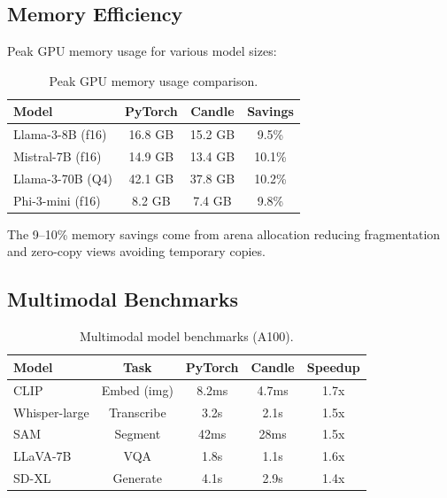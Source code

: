 \subsection{Memory Efficiency}

Peak GPU memory usage for various model sizes:

\begin{table}[H]
\centering
\small
\begin{tabular}{lccc}
\toprule
\textbf{Model} & \textbf{PyTorch} & \textbf{Candle} & \textbf{Savings} \\
\midrule
Llama-3-8B (f16) & 16.8 GB & 15.2 GB & 9.5\% \\
Mistral-7B (f16) & 14.9 GB & 13.4 GB & 10.1\% \\
Llama-3-70B (Q4) & 42.1 GB & 37.8 GB & 10.2\% \\
Phi-3-mini (f16) & 8.2 GB & 7.4 GB & 9.8\% \\
\bottomrule
\end{tabular}
\caption{Peak GPU memory usage comparison.}
\label{tab:memory}
\end{table}

The 9--10\% memory savings come from arena allocation reducing fragmentation and zero-copy views avoiding temporary copies.

\subsection{Multimodal Benchmarks}

\begin{table}[H]
\centering
\small
\begin{tabular}{lcccc}
\toprule
\textbf{Model} & \textbf{Task} & \textbf{PyTorch} & \textbf{Candle} & \textbf{Speedup} \\
\midrule
CLIP & Embed (img) & 8.2ms & 4.7ms & 1.7x \\
Whisper-large & Transcribe & 3.2s & 2.1s & 1.5x \\
SAM & Segment & 42ms & 28ms & 1.5x \\
LLaVA-7B & VQA & 1.8s & 1.1s & 1.6x \\
SD-XL & Generate & 4.1s & 2.9s & 1.4x \\
\bottomrule
\end{tabular}
\caption{Multimodal model benchmarks (A100).}
\label{tab:multimodal}
\end{table}

